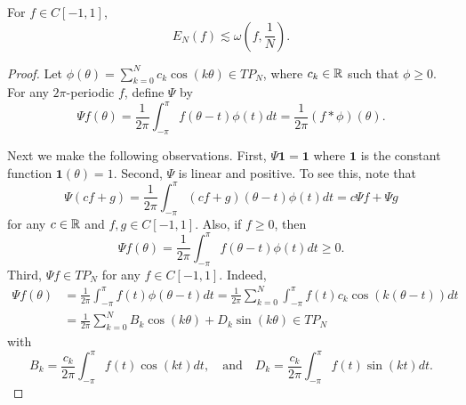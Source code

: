 \begin{theorem}[Jackson]
    For $f\in C[-1,1]$, 
    \begin{equation*}
        E_N(f) \lesssim \omega(f,\frac{1}{N}).
    \end{equation*}
\end{theorem}
\begin{proof}
    Let $\phi(\theta) = \sum_{k=0}^{N} c_k\cos(k\theta)\in TP_N$, 
    where $c_k\in\mathbb{R}$ such that $\phi\geq 0$. For any $2\pi$-periodic 
    $f$, define $\Psi$ by 
    \begin{equation*}
        \Psi f(\theta) = \frac{1}{2\pi}\int_{-\pi}^\pi f(\theta - t)\phi(t)dt = \frac{1}{2\pi}(f*\phi)(\theta).
    \end{equation*}

    Next we make the following observations. First, $\Psi\mathbf{1} = \mathbf{1}$ 
    where $\mathbf{1}$ is the constant function $\mathbf{1}(\theta) = 1$. Second, 
    $\Psi$ is linear and positive. To see this, note that 
    \begin{equation*}
        \Psi(cf+g) = \frac{1}{2\pi}\int_{-\pi}^\pi (cf+g)(\theta - t)\phi(t)dt = c\Psi f + \Psi g
    \end{equation*}
    for any $c\in\mathbb{R}$ and $f,g\in C[-1,1]$. Also, if $f\geq 0$, then 
    \begin{equation*}
        \Psi f(\theta) = \frac{1}{2\pi}\int_{-\pi}^\pi f(\theta - t)\phi(t)dt \geq 0.
    \end{equation*}
    Third, $\Psi f\in TP_N$ for any $f\in C[-1,1]$. Indeed, 
    \begin{equation*}
        \begin{split}
            \Psi f(\theta) &= \frac{1}{2\pi}\int_{-\pi}^{\pi} f(t)\phi(\theta - t)dt 
            = \frac{1}{2\pi}\sum_{k=0}^{N}\int_{-\pi}^{\pi} f(t)c_k\cos(k(\theta - t))dt \\ 
            &= \frac{1}{2\pi}\sum_{k=0}^{N} B_k\cos(k\theta) + D_k\sin(k\theta) \in TP_N
        \end{split}
    \end{equation*}
    with 
    \begin{equation*}
        B_k = \frac{c_k}{2\pi}\int_{-\pi}^{\pi} f(t)\cos(kt)dt, 
        \quad \text{and} \quad
        D_k = \frac{c_k}{2\pi}\int_{-\pi}^{\pi} f(t)\sin(kt)dt.
    \end{equation*}


\end{proof}
